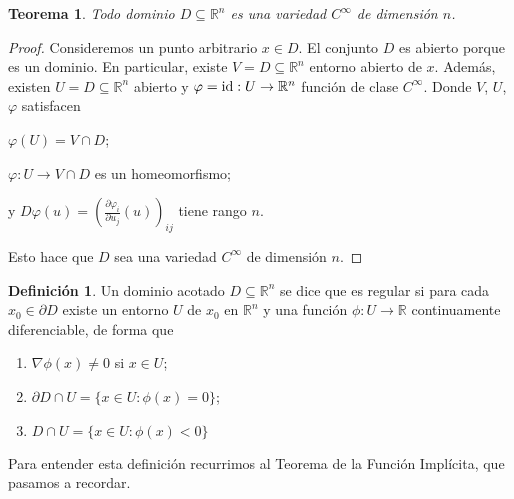 \documentclass{report}
\newcommand{\realNumbers}{\mathbb{R}}
\newtheorem{theorem}{Teorema}
\theoremstyle{definition}
\newtheorem{definition}{Definición}
\theoremstyle{remark}
\begin{document}
  \begin{theorem}
    Todo dominio \(D \subseteq \realNumbers^n\) es una variedad \(C^{\infty}\) de dimensión \(n\).
  \end{theorem}
  \begin{proof}
    Consideremos un punto arbitrario \(x \in D\).
    El conjunto \(D\) es abierto porque es un dominio.
    En particular, existe \(V = D \subseteq \realNumbers^n\) entorno abierto de \(x\).
    \newcommand{\identity}{\textnormal{id}}
    Además, existen \(U = D \subseteq \realNumbers^n\) abierto y \(\varphi = \identity : U \rightarrow \realNumbers^n\) función de clase \(C^{\infty}\).
    Donde \(V\), \(U\), \(\varphi\) satisfacen
    \begin{enumerate*}
      \item \(\varphi(U) = V \cap D\);
      \item \(\varphi : U \rightarrow V \cap D\) es un homeomorfismo;
      \item y \(D \varphi (u) = \left( \frac{\partial \varphi_i}{\partial u_j}(u) \right)_{i j}\) tiene rango \(n\).
    \end{enumerate*}
    Esto hace que \(D\) sea una variedad \(C^{\infty}\) de dimensión \(n\).
  \end{proof}

  \begin{definition}
    Un dominio acotado \(D \subseteq \realNumbers^n\) se dice que es regular si para cada \(x_0 \in \partial D\) existe un entorno \(U\) de \(x_0\) en \(\realNumbers^n\) y una función \(\phi : U \rightarrow \realNumbers\) continuamente diferenciable, de forma que
    \begin{enumerate}
      \item \(\nabla \phi(x) \neq 0\) si \(x \in U\);
      \item \(\partial D \cap U = \{x \in U : \phi(x) = 0\}\);
      \item \(D \cap U = \{x \in U : \phi(x) < 0\}\)
    \end{enumerate}
  \end{definition}

  Para entender esta definición recurrimos al Teorema de la Función Implícita, que pasamos a recordar.
\end{document}
